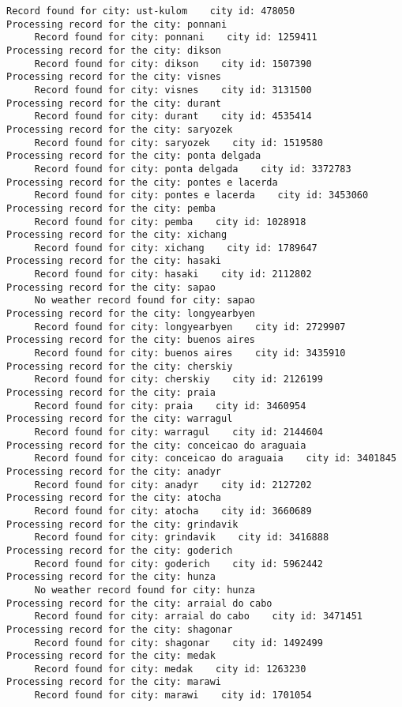 \documentclass[11pt]{article}
\begin{document}
\begin{Verbatim}[commandchars=\\\{\}]
     Record found for city: ust-kulom    city id: 478050
Processing record for the city: ponnani
     Record found for city: ponnani    city id: 1259411
Processing record for the city: dikson
     Record found for city: dikson    city id: 1507390
Processing record for the city: visnes
     Record found for city: visnes    city id: 3131500
Processing record for the city: durant
     Record found for city: durant    city id: 4535414
Processing record for the city: saryozek
     Record found for city: saryozek    city id: 1519580
Processing record for the city: ponta delgada
     Record found for city: ponta delgada    city id: 3372783
Processing record for the city: pontes e lacerda
     Record found for city: pontes e lacerda    city id: 3453060
Processing record for the city: pemba
     Record found for city: pemba    city id: 1028918
Processing record for the city: xichang
     Record found for city: xichang    city id: 1789647
Processing record for the city: hasaki
     Record found for city: hasaki    city id: 2112802
Processing record for the city: sapao
     No weather record found for city: sapao
Processing record for the city: longyearbyen
     Record found for city: longyearbyen    city id: 2729907
Processing record for the city: buenos aires
     Record found for city: buenos aires    city id: 3435910
Processing record for the city: cherskiy
     Record found for city: cherskiy    city id: 2126199
Processing record for the city: praia
     Record found for city: praia    city id: 3460954
Processing record for the city: warragul
     Record found for city: warragul    city id: 2144604
Processing record for the city: conceicao do araguaia
     Record found for city: conceicao do araguaia    city id: 3401845
Processing record for the city: anadyr
     Record found for city: anadyr    city id: 2127202
Processing record for the city: atocha
     Record found for city: atocha    city id: 3660689
Processing record for the city: grindavik
     Record found for city: grindavik    city id: 3416888
Processing record for the city: goderich
     Record found for city: goderich    city id: 5962442
Processing record for the city: hunza
     No weather record found for city: hunza
Processing record for the city: arraial do cabo
     Record found for city: arraial do cabo    city id: 3471451
Processing record for the city: shagonar
     Record found for city: shagonar    city id: 1492499
Processing record for the city: medak
     Record found for city: medak    city id: 1263230
Processing record for the city: marawi
     Record found for city: marawi    city id: 1701054

\end{Verbatim}
\end{document}

